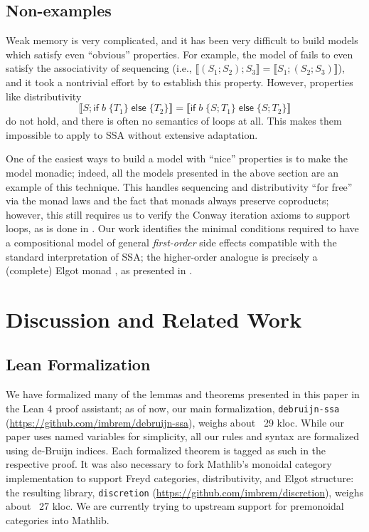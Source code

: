 \documentclass[acmsmall,screen,review]{acmart}
\newcommand{\ms}[1]{\ensuremath{\mathsf{#1}}}
\newcommand{\ite}[3]{\ms{if}\;#1\;\{#2\}\;\ms{else}\;\{#3\}}
\newcommand{\dnt}[1]{\llbracket{#1}\rrbracket}
\begin{document}
\subsection{Non-examples}

Weak memory is very complicated, and it has been very difficult to build models which  satisfy
even ``obvious'' properties. For example, the model of \citet{jagadeesan-pwp-20} fails to even
satisfy the associativity of sequencing (i.e., $\dnt{(S_1 ; S_2) ; S_3} = \dnt{S_1 ; (S_2 ; S_3)}$),
and it took a nontrivial effort by \citet{leaky-semicolon} to establish this property. However,
properties like distributivity
\begin{equation*}
  \dnt{S ; \ite{b}{T_1}{T_2}} = \dnt{\ite{b}{S ; T_1}{S ; T_2}}
\end{equation*}
do not hold, and there is often no semantics of 
loops at all. This makes them impossible to apply to SSA without extensive
adaptation.

One of the easiest ways to build a model with ``nice'' properties is to make the model
monadic; indeed, all the models presented in the above section are an example of this technique.
This handles sequencing and distributivity ``for free'' via the monad laws and the fact that monads
always preserve coproducts; however, this still requires us to verify the Conway iteration axioms to
support loops, as is done in \citet{xia-itrees-20}. Our work identifies the minimal
conditions required to have a compositional model of general \emph{first-order} side effects
compatible with the standard interpretation of SSA; the higher-order analogue is precisely a
(complete) Elgot monad \cite{adamek-elgot-11}, as presented in \citet{goncharov-unguarded-18}.

\section{Discussion and Related Work}

\subsection{Lean Formalization}

We have formalized many of the lemmas and theorems presented in this paper in the Lean 4 proof
assistant; as of now, our main formalization, \texttt{debruijn-ssa}
(\url{https://github.com/imbrem/debruijn-ssa}), weighs about ~29 kloc. While our paper uses named
variables for simplicity, all our rules and syntax are formalized using de-Bruijn indices. Each
formalized theorem is tagged as such in the respective proof. It was also necessary to fork
Mathlib's monoidal category implementation to support Freyd categories, distributivity, and Elgot
structure: the resulting library, \texttt{discretion} (\url{https://github.com/imbrem/discretion}),
weighs about ~27 kloc. We are currently trying to upstream support for premonoidal categories into
Mathlib.
\end{document}
